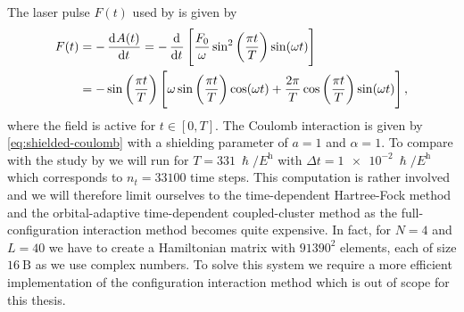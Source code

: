         The laser pulse $F(t)$ used by \citeauthor{miyagi_and_madsen} is given
        by \cite{miyagi_and_madsen}
        \begin{align}
            F(t)
            &= -\dod[]{A(t)}{t}
            = -\dod[]{}{t}\brak{
                \frac{F_0}{\omega}
                \sin^2\para{\frac{\pi t}{T}}
                \sin(\omega t)
            }
            \\
            &=
            -\sin\para{\frac{\pi t}{T}}\brak{
                \omega \sin\para{\frac{\pi t}{T}}
                \cos(\omega t)
                + \frac{2\pi}{T}
                \cos\para{\frac{\pi t}{T}}
                \sin(\omega t)
            },
            \label{eq:miyagi-laser}
        \end{align}
        where the field is active for $t \in [0, T]$.
        The Coulomb interaction is given by \autoref{eq:shielded-coulomb} with a
        shielding parameter of $a = 1$ and $\alpha = 1$.
        To compare with the study by \citeauthor{miyagi_and_madsen}
        \cite{miyagi_and_madsen} we will run for $T =
        \SI{331}{\hslash/\hartree}$ with $\Delta t =
        \SI{1e-2}{\hslash/\hartree}$ which corresponds to $n_t = 33100$ time
        steps.
        This computation is rather involved and we will therefore limit
        ourselves to the time-dependent Hartree-Fock method and the
        orbital-adaptive time-dependent coupled-cluster method as the
        full-configuration interaction method becomes quite expensive.
        In fact, for $N = 4$ and $L = 40$ we have to create a Hamiltonian
        matrix with $91390^2$ elements, each of size $\SI{16}{\text{B}}$ as
        we use complex numbers.
        To solve this system we require a more efficient implementation of the
        configuration interaction method which is out of scope for this thesis.


